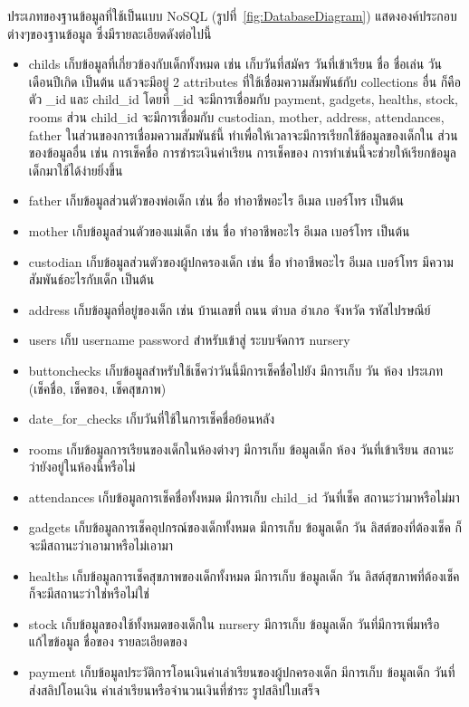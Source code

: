 ประเภทของฐานข้อมูลที่ใช้เป็นแบบ NoSQL
(รูปที่~\ref{fig:DatabaseDiagram}) แสดงองค์ประกอบต่างๆของฐานข้อมูล ซึ่งมีรายละเอียดดังต่อไปนี้
%
  \begin{itemize}
    \item childs เก็บข้อมูลที่เกี่ยวข้องกับเด็กทั้งหมด เช่น เก็บวันที่สมัคร วันที่เข้าเรียน ชื่อ ชื่อเล่น วันเดือนปีเกิด เป็นต้น แล้วจะมีอยู่ 2 attributes ที่ใช้เชื่อมความสัมพันธ์กับ collections อื่น ก็คือ ตัว \_id และ child\_id 
    โดยที่ \_id จะมีการเชื่อมกับ payment, gadgets, healths, stock, rooms
    ส่วน child\_id จะมีการเชื่อมกับ custodian, mother, address, attendances, father 
    ในส่วนของการเชื่อมความสัมพันธ์นี้ ทำเพื่อให้เวลาจะมีการเรียกใช้ข้อมูลของเด็กใน ส่วนของข้อมูลอื่น เช่น การเช็คชื่อ การชำระเงินค่าเรียน การเช็คของ    การทำเช่นนี้จะช่วยให้เรียกข้อมูลเด็กมาใช้ได้ง่ายยิ่งขึ้น
    \item father เก็บข้อมูลส่วนตัวของพ่อเด็ก เช่น ชื่อ ทำอาชีพอะไร อีเมล เบอร์โทร เป็นต้น
    \item mother เก็บข้อมูลส่วนตัวของแม่เด็ก เช่น ชื่อ ทำอาชีพอะไร อีเมล เบอร์โทร เป็นต้น
    \item custodian เก็บข้อมูลส่วนตัวของผู้ปกครองเด็ก เช่น ชื่อ ทำอาชีพอะไร อีเมล เบอร์โทร มีความสัมพันธ์อะไรกับเด็ก เป็นต้น
    \item address เก็บข้อมูลที่อยู่ของเด็ก เช่น บ้านเลขที่ ถนน ตำบล อำเภอ จังหวัด รหัสไปรษณีย์ 
    \item users เก็บ username password สำหรับเข้าสู่ ระบบจัดการ nursery 
    \item buttonchecks เก็บข้อมูลสำหรับใช้เช็คว่าวันนี้มีการเช็คชื่อไปยัง มีการเก็บ วัน ห้อง ประเภท (เช็คชื่อ, เช็คของ, เช็คสุขภาพ)
    \item date\_for\_checks เก็บวันที่ใช้ในการเช็คชื่อย้อนหลัง
    \item rooms เก็บข้อมูลการเรียนของเด็กในห้องต่างๆ มีการเก็บ ข้อมูลเด็ก ห้อง วันที่เข้าเรียน สถานะว่ายังอยู่ในห้องนี้หรือไม่
    \item attendances เก็บข้อมูลการเช็คชื่อทั้งหมด มีการเก็บ child\_id วันที่เช็ค สถานะว่ามาหรือไม่มา
    \item gadgets เก็บข้อมูลการเช็คอุปกรณ์ของเด็กทั้งหมด มีการเก็บ ข้อมูลเด็ก วัน ลิสต์ของที่ต้องเช็ค ก็จะมีสถานะว่าเอามาหรือไม่เอามา
    \item healths เก็บข้อมูลการเช็คสุขภาพของเด็กทั้งหมด มีการเก็บ ข้อมูลเด็ก วัน ลิสต์สุขภาพที่ต้องเช็ค ก็จะมีสถานะว่าใช่หรือไม่ใช่
    \item stock เก็บข้อมูลของใช้ทั้งหมดของเด็กใน nursery มีการเก็บ ข้อมูลเด็ก วันที่มีการเพิ่มหรือแก้ไขข้อมูล ชื่อของ รายละเอียดของ
    \item payment เก็บข้อมูลประวัติการโอนเงินค่าเล่าเรียนของผู้ปกครองเด็ก มีการเก็บ ข้อมูลเด็ก วันที่ส่งสลิปโอนเงิน ค่าเล่าเรียนหรือจำนวนเงินที่ชำระ รูปสลิปใบเสร็จ 
  \end{itemize}
